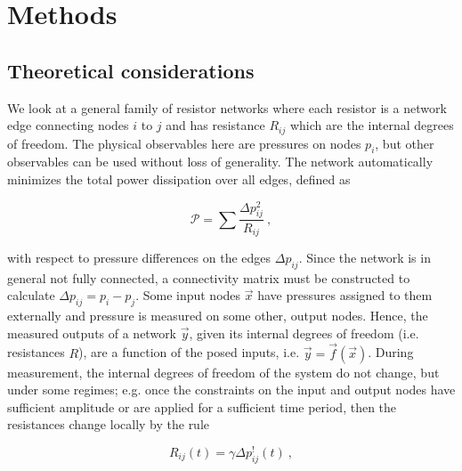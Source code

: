 \documentclass[%
 reprint,
 amsmath,amssymb,
 aps,
]{revtex4-2}
\begin{document}
\section{Methods}\label{sec:Methods}

\subsection{Theoretical considerations}\label{sec:theoretical}

    We look at a general family of resistor networks where each resistor is a network edge connecting nodes $i$ to $j$ and has resistance $R_{ij}$ which are the internal degrees of freedom. The physical observables here are pressures on nodes $p_i$, but other observables can be used without loss of generality. The network automatically minimizes the total power dissipation over all edges, defined as
    
    \begin{equation}\label{eq:power_dissipation}
        \mathcal{P}=\sum \frac{\Delta p_{ij}^2}{R_{ij}} \ ,
    \end{equation}

    with respect to pressure differences on the edges $\Delta p_{ij}$. 
    Since the network is in general not fully connected, a connectivity matrix must be constructed to calculate $\Delta p_{ij}=p_i-p_j$. Some input nodes $\vec{x}$ have pressures assigned to them externally and pressure is measured on some other, output nodes. Hence, the measured outputs of a network $\vec{y}$, given its internal degrees of freedom (i.e. resistances $R$), are a function of the posed inputs, i.e. $\vec{y}=\vec{f}\left(\vec{x}\right)$.  
    During measurement, the internal degrees of freedom of the system do not change, but under some regimes; e.g. once the constraints on the input and output nodes have sufficient amplitude or are applied for a sufficient time period, then the resistances change locally by the rule

    \begin{equation}\label{eq:R_afo_deltap}
        R_{ij}\left(t\right)=\gamma \Delta p^!_{ij}\left(t\right) \ ,
    \end{equation}
\end{document}

